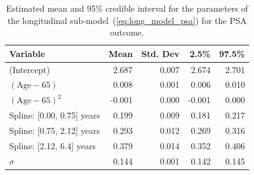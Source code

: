 \begin{table}[!htb]
\begin{center}
\caption{Estimated mean and 95\% credible interval for the parameters of the longitudinal sub-model~(\ref{eq:long_model_psa}) for the PSA outcome.}
\label{tab:PSA_long}
\begin{tabular}{lrrrr}
\hline
\hline
Variable                         & Mean & Std. Dev & 2.5\%  & 97.5\% \\
\hline
(Intercept) & 2.687 & 0.007 & 2.674 & 2.701 \\
$(\mbox{Age} - 65)$ & 0.008 & 0.001 & 0.006 & 0.010 \\
$(\mbox{Age} - 65)^2$ & -0.001 & 0.000 & -0.001 & 0.000 \\
Spline: [0.00, 0.75] years & 0.199 & 0.009 & 0.181 & 0.217 \\
Spline: [0.75, 2.12] years & 0.293 & 0.012 & 0.269 & 0.316 \\
Spline: [2.12, 6.4] years & 0.379 & 0.014 & 0.352 & 0.406\\
$\sigma$ & 0.144 & 0.001 & 0.142 & 0.145\\
\hline
\end{tabular}
\end{center}
\end{table}




